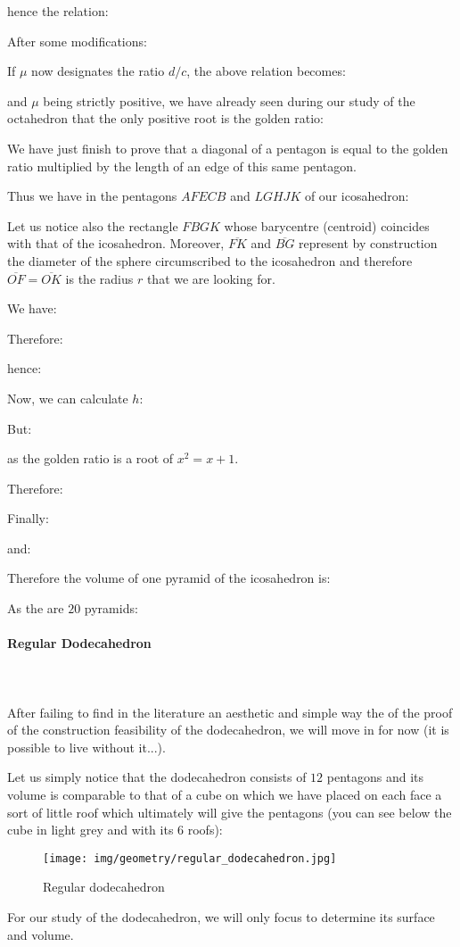 {	hence the relation:
	
	After some modifications:
	
	If $\mu$ now designates the ratio $d/c$, the above relation becomes:
	
	and $\mu$ being strictly positive, we have already seen during our study of the octahedron that the only positive root is the golden ratio:
	
	We have just finish to prove that a diagonal of a pentagon is equal to the golden ratio multiplied by the length of an edge of this same pentagon.
	
	Thus we have in the pentagons $AFECB$ and $LGHJK$ of our icosahedron:
	
	Let us notice also the rectangle $FBGK$ whose barycentre (centroid) coincides with that of the icosahedron. Moreover, $\overline{FK}$ and $\overline{BG}$ represent by construction the diameter of the sphere circumscribed to the icosahedron and therefore $\overline{OF}=\overline{OK}$ is the radius $r$ that we are looking for.

	We have:
	
	Therefore:
	
	hence:
	
	Now, we can calculate $h$:
	
	But:
	
	as the golden ratio is a root of $x^2=x+1$.

	Therefore:
	
	Finally:
	
	and:
	
	Therefore the volume of one pyramid of the icosahedron is:
	
	As the are $20$ pyramids:
	
	
	\paragraph{Regular Dodecahedron}\mbox{}\\\\
	After failing to find in the literature an aesthetic and simple way the of the proof of the construction feasibility of the dodecahedron, we will move in for now (it is possible to live without it...).
	
	Let us simply notice that the dodecahedron consists of $12$ pentagons and its volume is comparable to that of a cube on which we have placed on each face a sort of little roof which ultimately will give the pentagons (you can see below the cube in light grey and with its $6$ roofs):
	\begin{figure}[H]
		\centering
		\texttt{[image: img/geometry/regular\_dodecahedron.jpg]}
		\caption{Regular dodecahedron}
	\end{figure}
	For our study of the dodecahedron, we will only focus to determine its surface and volume.
	
}
